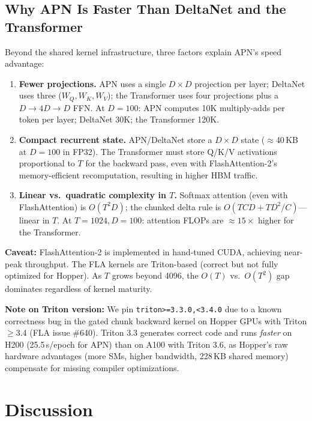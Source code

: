 \documentclass[11pt,a4paper]{article}
\begin{document}
\subsection{Why APN Is Faster Than DeltaNet and the Transformer}

Beyond the shared kernel infrastructure, three factors explain APN's speed advantage:

\begin{enumerate}
\item \textbf{Fewer projections.}
APN uses a single $D \times D$ projection per layer; DeltaNet uses three ($W_Q, W_K, W_V$); the Transformer uses four projections plus a $D \to 4D \to D$ FFN.
At $D=100$: APN computes 10K multiply-adds per token per layer; DeltaNet 30K; the Transformer 120K.

\item \textbf{Compact recurrent state.}
APN/DeltaNet store a $D \times D$ state ($\approx$40\,KB at $D=100$ in FP32).
The Transformer must store Q/K/V activations proportional to $T$ for the backward pass, even with FlashAttention-2's memory-efficient recomputation, resulting in higher HBM traffic.

\item \textbf{Linear vs.\ quadratic complexity in $T$.}
Softmax attention (even with FlashAttention) is $O(T^2 D)$; the chunked delta rule is $O(TCD + TD^2/C)$---linear in $T$.
At $T=1024, D=100$: attention FLOPs are $\approx 15\times$ higher for the Transformer.
\end{enumerate}

\textbf{Caveat:} FlashAttention-2 is implemented in hand-tuned CUDA, achieving near-peak throughput.
The FLA kernels are Triton-based (correct but not fully optimized for Hopper).
As $T$ grows beyond 4096, the $O(T)$ vs.\ $O(T^2)$ gap dominates regardless of kernel maturity.

\textbf{Note on Triton version:} We pin \texttt{triton>=3.3.0,<3.4.0} due to a known correctness bug in the gated chunk backward kernel on Hopper GPUs with Triton $\ge$3.4 (FLA issue \#640).
Triton 3.3 generates correct code and runs \emph{faster} on H200 (25.5\,s/epoch for APN) than on A100 with Triton 3.6, as Hopper's raw hardware advantages (more SMs, higher bandwidth, 228\,KB shared memory) compensate for missing compiler optimizations.

\section{Discussion}
\end{document}
